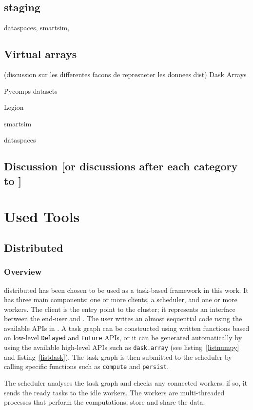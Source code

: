 \subsection{staging}
dataspaces, smartsim, 
\subsection{Virtual arrays}
(discussion sur les differentes facons de represneter les donnees dist)
Dask Arrays 

Pycomps datasets 

Legion

smartsim

dataspaces

\subsection{Discussion [or discussions after each category to ]}

\section{Used Tools}




\subsection{\dask Distributed}\label{sec:dask.distributed}
\subsubsection{Overview}
\dask distributed has been chosen to be used as a task-based framework in this work.  
It has three main components: one or more clients, a scheduler, and one or more workers. The client is the entry point to the \dask cluster; it represents an interface between the end-user and \dask. 
The user writes an almost sequential code using the available APIs in \dask. A task graph can be constructed using written functions based on low-level \texttt{Delayed} and \texttt{Future} APIs, or it can be generated automatically by using the available high-level APIs such as \texttt{dask.array} (see listing~\ref{listnumpy} and listing~\ref{listdask}). The task graph is then submitted to the scheduler by calling specific functions such as \texttt{compute} and \texttt{persist}.    

The scheduler analyses the task graph and checks any connected workers; if so, it sends the ready tasks to the idle workers. The workers are multi-threaded processes that perform the computations, store and share the data. 

